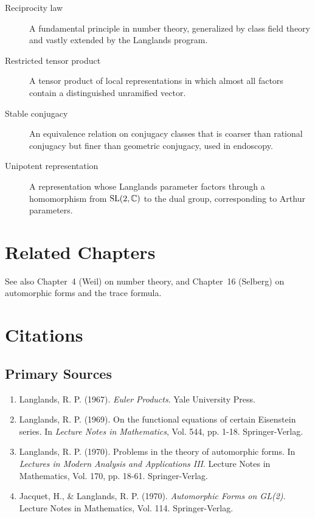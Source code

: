 \begin{description}
\item[Reciprocity law] A fundamental principle in number theory, generalized by class field theory and vastly extended by the Langlands program.
\item[Restricted tensor product] A tensor product of local representations in which almost all factors contain a distinguished unramified vector.
\item[Stable conjugacy] An equivalence relation on conjugacy classes that is coarser than rational conjugacy but finer than geometric conjugacy, used in endoscopy.
\item[Unipotent representation] A representation whose Langlands parameter factors through a homomorphism from \(\operatorname{SL}(2,\mathbb{C})\) to the dual group, corresponding to Arthur parameters.
\end{description}

\section{Related Chapters}
See also Chapter~4 (Weil) on number theory, and Chapter~16 (Selberg) on automorphic forms and the trace formula.

\section{Citations}

\subsection*{Primary Sources}
\begin{enumerate}
    \item Langlands, R. P. (1967). \textit{Euler Products}. Yale University Press.
    \item Langlands, R. P. (1969). On the functional equations of certain Eisenstein series. In \textit{Lecture Notes in Mathematics}, Vol. 544, pp. 1-18. Springer-Verlag.
    \item Langlands, R. P. (1970). Problems in the theory of automorphic forms. In \textit{Lectures in Modern Analysis and Applications III}. Lecture Notes in Mathematics, Vol. 170, pp. 18-61. Springer-Verlag.
    \item Jacquet, H., \& Langlands, R. P. (1970). \textit{Automorphic Forms on GL(2)}. Lecture Notes in Mathematics, Vol. 114. Springer-Verlag.
\end{enumerate}

